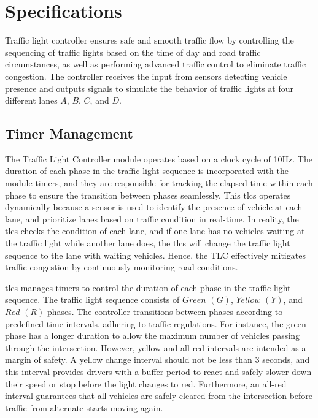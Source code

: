 \section{Specifications}
Traffic light controller ensures safe and smooth traffic flow by controlling the sequencing of traffic lights based on the time of day and road traffic circumstances, as well as performing advanced traffic control to eliminate traffic congestion. The controller receives the input from sensors detecting vehicle presence and outputs signals to simulate the behavior of traffic lights at four different lanes $A$, $B$, $C$, and $D$.

\subsection{Timer Management}
The Traffic Light Controller module operates based on a clock cycle of 10Hz. The duration of each phase in the traffic light sequence is incorporated with the module timers, and they are responsible for tracking the elapsed time within each phase to ensure the transition between phases seamlessly.  This \acs{tlcs} operates dynamically because a sensor is used to identify the presence of vehicle at each lane, and prioritize lanes based on traffic condition in real-time. In reality, the \acs{tlcs} checks the condition of each lane, and if one lane has no vehicles waiting at the traffic light while another lane does, the \acs{tlcs} will change the traffic light sequence to the lane with waiting vehicles. Hence, the TLC effectively mitigates traffic congestion by continuously monitoring road conditions.

\acs{tlcs} manages timers to control the duration of each phase in the traffic light sequence. The traffic light sequence consists of $Green$ $(G)$, $Yellow$ $(Y)$, and $Red$ $(R)$ phases. The controller transitions between phases according to predefined time intervals, adhering to traffic regulations. For instance, the green phase has a longer duration to allow the maximum number of vehicles passing through the intersection. However, yellow and all-red intervals are intended as a margin of safety. A yellow change interval should not be less than 3 seconds, and this interval provides drivers with a buffer period to react and safely slower down their speed or stop before the light changes to red. Furthermore, an all-red interval guarantees that all vehicles are safely cleared from the intersection before traffic from alternate starts moving again.

